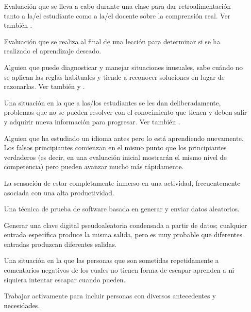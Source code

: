 \begin{description}
 Evaluación que se lleva a cabo
durante una clase para dar retroalimentación tanto a la/el estudiante como a la/el docente
sobre la comprensión real. Ver también .

 Evaluación que se realiza al final de una lección para determinar si se ha realizado el aprendizaje deseado.

 Alguien que puede diagnosticar y manejar situaciones inusuales,  sabe cuándo no se aplican las reglas habituales y tiende a reconocer soluciones en lugar de razonarlas.
Ver también 
y .

 Una situación en la que a las/los estudiantes se les dan deliberadamente, problemas que no se pueden resolver con el conocimiento que tienen y deben salir y adquirir nueva información para progresar.
Ver también .

 Alguien que ha estudiado un idioma antes pero lo está aprendiendo nuevamente. Los falsos principiantes comienzan en el mismo punto que los principiantes verdaderos (es decir, en una evaluación inicial mostrarán el mismo nivel de competencia) pero pueden avanzar mucho más rápidamente.

 La sensación de estar completamente inmerso en una actividad,
frecuentemente asociada con una alta productividad.

 Una técnica de prueba de software
basada en generar y enviar datos aleatorios.

 Generar una clave digital pseudoaleatoria condensada a partir de datos; cualquier entrada específica produce la misma salida, pero es muy probable que diferentes entradas produzcan diferentes salidas.

 Una situación en la que las personas que son sometidas repetidamente a comentarios negativos de los cuales no tienen forma de escapar aprenden a ni siquiera intentar escapar cuando pueden.

 Trabajar activamente para incluir
personas con diversos antecedentes y necesidades.


\end{description}
